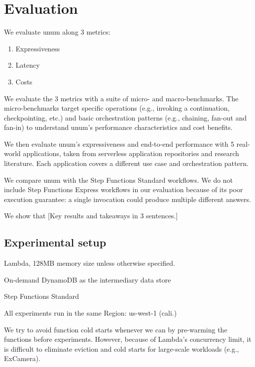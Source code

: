 \section{Evaluation}\label{sec:eval}

We evaluate unum along 3 metrics:

\begin{enumerate}
    
    \item Expressiveness

    \item Latency

    \item Costs

\end{enumerate}

We evaluate the 3 metrics with a suite of micro- and macro-benchmarks. The
micro-benchmarks target specific operations (e.g., invoking a continuation,
checkpointing, etc.) and basic orchestration patterns (e.g., chaining, fan-out
and fan-in) to understand unum's performance characteristics and cost
benefits.

We then evaluate unum's expressiveness and end-to-end performance with 5
real-world applications, taken from serverless application repositories and
research literature. Each application covers a different use case and
orchestration pattern.

We compare unum with the Step Functions Standard workflows. We do not include
Step Functions Express workflows in our evaluation because of its poor
execution guarantee: a single invocation could produce multiple different
answers.



We show that [Key results and takeaways in 3 sentences.]

\subsection{Experimental setup}

Lambda, 128MB memory size unless otherwise specified.

On-demand DynamoDB as the intermediary data store

Step Functions Standard

All experiments run in the same Region: us-west-1 (cali.)

We try to avoid function cold starts whenever we can by pre-warming the
functions before experiments. However, because of Lambda's concurrency limit,
it is difficult to eliminate eviction and cold starts for large-scale
workloads (e.g., ExCamera).

